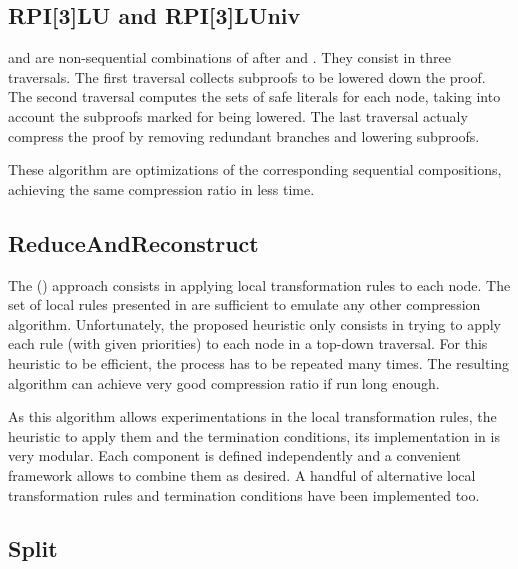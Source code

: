 \documentclass{llncs}
\begin{document}
\subsection{RPI[3]LU and RPI[3]LUniv}

 and  are non-sequential combinations of  after 
and . They consist in three traversals. The first traversal collects subproofs to be
lowered down the proof. The second traversal computes the sets of safe literals for each node,
taking into account the subproofs marked for being lowered. The last traversal actualy compress the
proof by removing redundant branches and lowering subproofs.

These algorithm are optimizations of the corresponding sequential compositions, achieving the
same compression ratio in less time. 

\subsection{ReduceAndReconstruct}

The  () approach consists in applying local transformation
rules to each node. The set of local rules presented in \cite{RedRec} are sufficient to emulate any
other compression algorithm. Unfortunately, the proposed heuristic only consists in trying to apply
each rule (with given priorities) to each node in a top-down traversal. For this heuristic to be
efficient, the process has to be repeated many times. The resulting algorithm can achieve very good
compression ratio if run long enough.

As this algorithm allows experimentations in the local transformation rules, the heuristic to apply
them and the termination conditions, its implementation in \skeptik is very modular. Each component
is defined independently and a convenient framework allows to combine them as desired. A handful of
alternative local transformation rules and termination conditions have been implemented too.

\subsection{Split}
\end{document}

